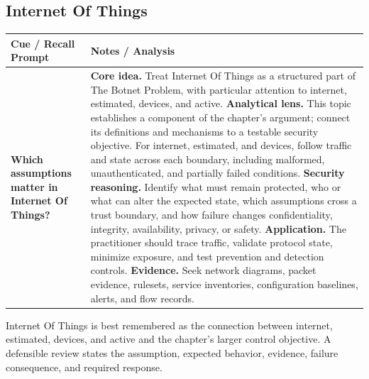 \documentclass[11pt]{article}
\newcommand{\CornellHeader}{%
\rowcolor{Navy}\color{white}\bfseries Cue / Recall Prompt & \color{white}\bfseries Notes / Analysis\\\hline}
\newcommand{\CornellRow}[2]{%
\cellcolor{CueGray}\RaggedRight\textbf{#1} & \RaggedRight #2\\\hline}
\begin{document}
\subsection*{Internet Of Things}
\begin{longtable}{>{\RaggedRight\arraybackslash}p{}|>{\RaggedRight\arraybackslash}p{}}
\CornellHeader
\CornellRow{Which assumptions matter in Internet Of Things?}{\textbf{Core idea.} Treat Internet Of Things as a structured part of The Botnet Problem, with particular attention to internet, estimated, devices, and active. \textbf{Analytical lens.} This topic establishes a component of the chapter's argument; connect its definitions and mechanisms to a testable security objective. For internet, estimated, and devices, follow traffic and state across each boundary, including malformed, unauthenticated, and partially failed conditions. \textbf{Security reasoning.} Identify what must remain protected, who or what can alter the expected state, which assumptions cross a trust boundary, and how failure changes confidentiality, integrity, availability, privacy, or safety. \textbf{Application.} The practitioner should trace traffic, validate protocol state, minimize exposure, and test prevention and detection controls. \textbf{Evidence.} Seek network diagrams, packet evidence, rulesets, service inventories, configuration baselines, alerts, and flow records.}
\end{longtable}
\begin{topicsummary}
Internet Of Things is best remembered as the connection between internet, estimated, devices, and active and the chapter's larger control objective. A defensible review states the assumption, expected behavior, evidence, failure consequence, and required response.
\end{topicsummary}
\end{document}
